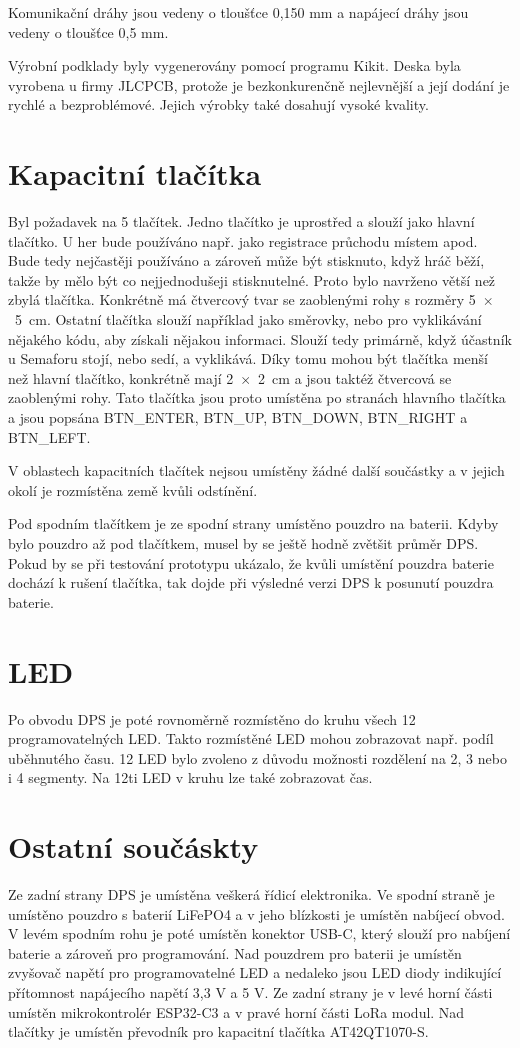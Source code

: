 Komunikační dráhy jsou vedeny o tloušťce 0,150 mm a napájecí dráhy jsou vedeny o tloušťce 0,5 mm. 

Výrobní podklady byly vygenerovány pomocí programu Kikit. Deska byla vyrobena u firmy JLCPCB, protože je bezkonkurenčně nejlevnější a její dodání je rychlé a bezproblémové. 
Jejich výrobky také dosahují vysoké kvality. 

\section{Kapacitní tlačítka} 
Byl požadavek na 5 tlačítek. Jedno tlačítko je uprostřed a slouží jako hlavní tlačítko. U her bude používáno např. jako registrace průchodu místem apod. Bude tedy nejčastěji
používáno a zároveň může být stisknuto, když hráč běží, takže by mělo být co nejjednodušeji stisknutelné. Proto bylo navrženo větší než zbylá tlačítka. Konkrétně má 
čtvercový tvar se zaoblenými rohy s rozměry 5~$\times$~5~cm. Ostatní tlačítka slouží například jako směrovky, nebo pro vyklikávání nějakého kódu, aby získali nějakou informaci. 
Slouží tedy primárně, když účastník u Semaforu stojí, nebo sedí, a vyklikává. Díky tomu mohou být tlačítka menší než hlavní tlačítko, konkrétně mají 2~$\times$~2~cm a jsou taktéž 
čtvercová se zaoblenými rohy. Tato tlačítka jsou proto umístěna po stranách hlavního tlačítka a jsou popsána BTN\_ENTER, BTN\_UP, BTN\_DOWN, BTN\_RIGHT a BTN\_LEFT.

V oblastech kapacitních tlačítek nejsou umístěny žádné další součástky a v jejich okolí je rozmístěna země kvůli odstínění. 

Pod spodním tlačítkem je ze spodní strany umístěno pouzdro na baterii. Kdyby bylo pouzdro až pod tlačítkem, musel by se ještě hodně zvětšit průměr DPS. Pokud by se při testování 
prototypu ukázalo, že kvůli umístění pouzdra baterie dochází k rušení tlačítka, tak dojde při výsledné verzi DPS k posunutí pouzdra baterie. 

\section{LED}
Po obvodu DPS je poté rovnoměrně rozmístěno do kruhu všech 12 programovatelných LED. Takto rozmístěné LED mohou zobrazovat např. podíl uběhnutého času. 12 LED bylo zvoleno z důvodu 
možnosti rozdělení na 2, 3 nebo i 4 segmenty. Na 12ti LED v kruhu lze také zobrazovat čas.

\section{Ostatní součáskty}
Ze zadní strany DPS je umístěna veškerá řídicí elektronika. Ve spodní straně je umístěno pouzdro s baterií LiFePO4 a v jeho blízkosti je umístěn nabíjecí obvod. V levém 
spodním rohu je poté umístěn konektor USB-C, který slouží pro nabíjení baterie a zároveň pro programování. Nad pouzdrem pro baterii je umístěn zvyšovač napětí pro programovatelné 
LED a nedaleko jsou LED diody indikující přítomnost napájecího napětí 3,3 V a 5 V. Ze zadní strany je v levé horní části umístěn mikrokontrolér ESP32-C3 a v pravé horní části 
LoRa modul. Nad tlačítky je umístěn převodník pro kapacitní tlačítka AT42QT1070-S.

